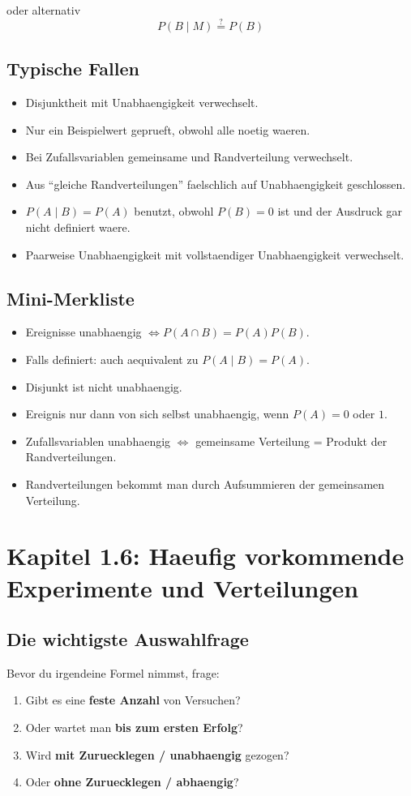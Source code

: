 \documentclass[a4paper,11pt]{article}
\begin{document}
oder alternativ
\[
P(B\mid M)\stackrel{?}{=}P(B)
\]

\subsection{Typische Fallen}
\begin{itemize}
  \item Disjunktheit mit Unabhaengigkeit verwechselt.
  \item Nur ein Beispielwert geprueft, obwohl alle noetig waeren.
  \item Bei Zufallsvariablen gemeinsame und Randverteilung verwechselt.
  \item Aus ``gleiche Randverteilungen'' faelschlich auf Unabhaengigkeit geschlossen.
  \item $P(A\mid B)=P(A)$ benutzt, obwohl $P(B)=0$ ist und der Ausdruck gar nicht definiert waere.
  \item Paarweise Unabhaengigkeit mit vollstaendiger Unabhaengigkeit verwechselt.
\end{itemize}

\subsection{Mini-Merkliste}
\begin{itemize}
  \item Ereignisse unabhaengig $\Leftrightarrow P(A \cap B)=P(A)P(B)$.
  \item Falls definiert: auch aequivalent zu $P(A\mid B)=P(A)$.
  \item Disjunkt ist nicht unabhaengig.
  \item Ereignis nur dann von sich selbst unabhaengig, wenn $P(A)=0$ oder $1$.
  \item Zufallsvariablen unabhaengig $\Leftrightarrow$ gemeinsame Verteilung = Produkt der Randverteilungen.
  \item Randverteilungen bekommt man durch Aufsummieren der gemeinsamen Verteilung.
\end{itemize}

\section{Kapitel 1.6: Haeufig vorkommende Experimente und Verteilungen}

\subsection{Die wichtigste Auswahlfrage}
Bevor du irgendeine Formel nimmst, frage:
\begin{enumerate}
  \item Gibt es eine \textbf{feste Anzahl} von Versuchen?
  \item Oder wartet man \textbf{bis zum ersten Erfolg}?
  \item Wird \textbf{mit Zuruecklegen / unabhaengig} gezogen?
  \item Oder \textbf{ohne Zuruecklegen / abhaengig}?
\end{enumerate}
\end{document}
